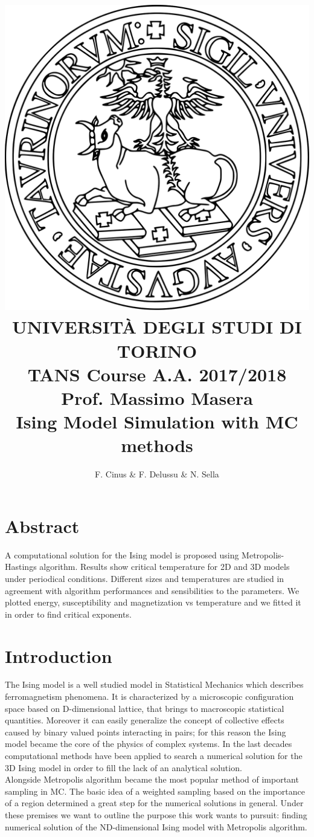 \documentclass[11pt,a4paper]{article}
\author{F. Cinus \& F. Delussu \& N. Sella}
\title{\includegraphics[scale=0.12]{Unito-logo} \\ \LARGE{UNIVERSIT\`{A} DEGLI STUDI DI TORINO}
  \\
  TANS Course A.A. 2017/2018 Prof. Massimo Masera
  \\
  \textbf{Ising Model Simulation with MC methods}
}
\begin{document}
\date{}
\maketitle
\bigskip
\section*{Abstract}
A computational solution for the Ising model is proposed using Metropolis-Hastings algorithm. Results show critical temperature for 2D and 3D models under periodical conditions. Different sizes and temperatures are studied in agreement with algorithm performances and sensibilities to the parameters. We plotted energy, susceptibility and magnetization vs temperature and we fitted it in order to find critical exponents.


\newpage
\section*{Introduction}
The Ising model is a well studied model in Statistical Mechanics which describes ferromagnetism phenomena. It is characterized by a microscopic configuration space based on D-dimensional lattice, that brings to macroscopic statistical quantities. Moreover it can easily generalize the concept of collective effects caused by binary valued points interacting in pairs; for this reason the Ising model became the core of the physics of complex systems. In the last decades computational methods have been applied to search a numerical solution for the 3D Ising model in order to  fill the lack of an analytical solution.
\\
Alongside Metropolis algorithm became the most popular method of important sampling in MC. The basic idea of a weighted sampling based on the importance of a region determined a great step for the numerical solutions in general. Under these premises we want to outline the purpose this work wants to pursuit: finding numerical solution of the ND-dimensional Ising model with Metropolis algorithm.
\end{document}
